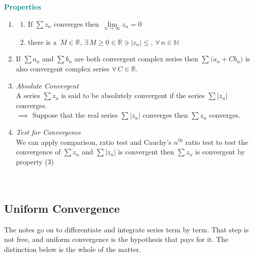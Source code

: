 \documentclass[11pt,a4paper]{article}
\theoremstyle{definition}
\begin{document}
\pagebreak
\textbf{\textcolor{teal}{Properties}}
\begin{enumerate}
\item
\begin{enumerate}
      \item If $\displaystyle{\sum z_n}$ converges then $\, \lim\limits_{n\rightarrow \infty} z_n = 0$
      
      \item there is a $\, M\in \mathbb{R},\,\exists \, M\geq 0 \in \mathbb{R} \ni \left|z_n\right|\leq, \, \forall\, n \in \mathbb{N}$
\end{enumerate}

\item If $\displaystyle{\sum a_n}$ and $\displaystyle{\sum b_n}$ are both convergent complex series then $\displaystyle{\sum \big(a_n + C b_n\big)}$ is also convergent complex series $\forall\,C \in \mathbb{R}$.


\item \textit{Absolute Convergent}\\
A series $\displaystyle{\sum z_n}$ is said to be absolutely convergent if the series $\displaystyle{\sum\left|z_n\right|}$ converges.\\
$\implies$ Suppose that the real series $\displaystyle{\sum \left|z_n\right|}$ converges then $\displaystyle{\sum z_n}$ converges.


\item \textit{Test for Convergence}\\
We can apply comparison, ratio test and Cauchy's $n^{\text{th}}$ ratio test to test the convergence of $\displaystyle{\sum z_n}$ and $\displaystyle{\sum \left|z_n\right|}$ is convergent then $\displaystyle{\sum z_n}$ is convergent by property (3)\\\\\\
\end{enumerate}





{\color[wave]{485}\subsection{Uniform Convergence}}

The notes go on to differentiate and integrate series term by term. That step is
not free, and uniform convergence is the hypothesis that pays for it. The
distinction below is the whole of the matter.
\end{document}
